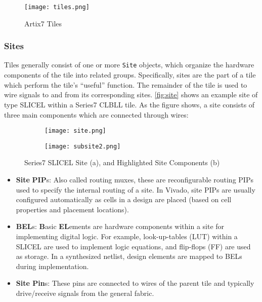 \begin{figure}[t!]
 \centering
 \texttt{[image: tiles.png]}
 \caption{Artix7 Tiles}
 \label{fig:tileExample}
\end{figure}

\subsubsection{Sites}
Tiles generally consist of one or more \texttt{Site} objects, which organize
the hardware components of the tile into related groups. Specifically, sites are
the part of a tile which perform the tile's ``useful'' function. The remainder
of the tile is used to wire signals to and from its corresponding sites.
\autoref{fig:site} shows an example site of type SLICEL within a Series7 CLBLL
tile. As the figure shows, a site consists of three main components which are
connected through wires:

\begin{figure}[p!]
\centering
   \begin{subfigure}[h!]{0.85\textwidth}
   \texttt{[image: site.png]}
   \caption{}
   \label{fig:site1}
\end{subfigure}

\begin{subfigure}[h!]{0.85\textwidth}
   \texttt{[image: subsite2.png]}
   \caption{}
   \label{fig:site2}
\end{subfigure}

\caption{Series7 SLICEL Site (a), and Highlighted Site Components (b)}
\label{fig:site}
\end{figure}

\begin{itemize}
  \item \textbf{Site} \textbf{PIP}s: Also called routing muxes, these are
  reconfigurable routing PIPs used to specify the internal routing of a site.
  In Vivado, site PIPs are usually configured automatically as cells in a
  design are placed (based on cell properties and placement locations).
  
  \item \textbf{BEL}s: \textbf{B}asic \textbf{EL}ements are hardware components
  within a site for implementing digital logic. For example, look-up-tables
  (LUT) within a SLICEL are used to implement logic equations, and flip-flops
  (FF) are used as storage. In a synthesized netlist, design elements are
  mapped to BELs during implementation.
   
  \item \textbf{Site Pin}s: These pins are connected to wires of the parent tile
  and typically drive/receive signals from the general fabric.
\end{itemize}

